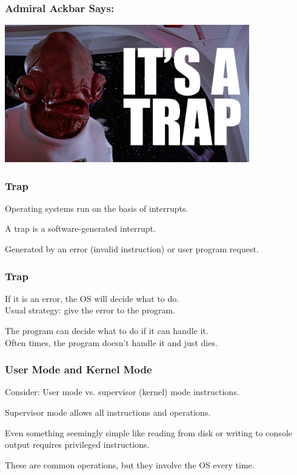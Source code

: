 \begin{frame}
	\frametitle{Admiral Ackbar Says:}

	\begin{center}
		\includegraphics[width=0.8\textwidth]{images/itsatrap.jpg}
	\end{center}

\end{frame}


\begin{frame}
	\frametitle{Trap}

	Operating systems run on the basis of interrupts.

	A \alert{trap} is a software-generated interrupt.

	Generated by an error (invalid instruction) or user program request.

\end{frame}

\begin{frame}
	\frametitle{Trap}

	If it is an error, the OS will decide what to do.\\
	\quad Usual strategy: give the error to the program.

	The program can decide what to do if it can handle it.\\
	\quad Often times, the program doesn't handle it and just dies.

\end{frame}

\begin{frame}
	\frametitle{User Mode and Kernel Mode}

	Consider: User mode vs. supervisor (kernel) mode instructions.

	Supervisor mode allows all instructions and operations.

	Even something seemingly simple like reading from disk or writing to console output requires privileged instructions.

	These are common operations, but they involve the OS every time.


\end{frame}

